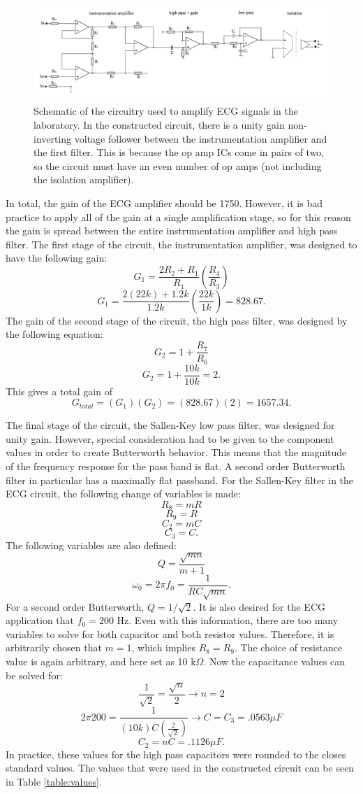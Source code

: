 \documentclass[pdftex,12pt,letterpaper]{article}
\begin{document}
\begin{figure}[H]
\begin{center}
\includegraphics[scale=.35]{ECG_circuit.png}
\caption{Schematic of the circuitry used to amplify ECG signals in the laboratory. In the constructed circuit, there is a unity gain non-inverting voltage follower between the instrumentation amplifier and the first filter. This is because the op amp ICs come in pairs of two, so the circuit must have an even number of op amps (not including the isolation amplifier).}
\label{fig:circuit}
\end{center}
\end{figure}

In total, the gain of the ECG amplifier should be 1750. However, it is bad practice to apply all of the gain at a single amplification stage, so for this reason the gain is spread between the entire instrumentation amplifier and high pass filter. The first stage of the circuit, the instrumentation amplifier, was designed to have the following gain:
$$
G_1 = \frac{2R_2+R_1}{R_1}(\frac{R_4}{R_3})
$$
$$
G_1 = \frac{2(22k)+1.2k}{1.2k}(\frac{22k}{1k}) = 828.67.
$$
The gain of the second stage of the circuit, the high pass filter,  was designed by the following equation:
$$
G_2 = 1 + \frac{R_7}{R_6}
$$
$$
G_2 = 1 + \frac{10k}{10k} = 2.
$$
This gives a total gain of
$$
G_{total} = (G_1)(G_2) = (828.67)(2) = 1657.34.
$$

The final stage of the circuit, the Sallen-Key low pass filter, was designed for unity gain. However, special consideration had to be given to the component values in order to create Butterworth behavior. This means that the magnitude of the frequency response for the pass band is flat. A second order Butterworth filter in particular has a maximally flat passband. For the Sallen-Key filter in the ECG circuit, the following change of variables is made:
$$
R_8 = mR
$$
$$
R_9 = R
$$
$$
C_2 = mC
$$
$$
C_3 = C.
$$
The following variables are also defined:
$$
Q = \frac{\sqrt{mn}}{m+1}
$$
$$
\omega_0 = 2\pi f_0 = \frac{1}{RC\sqrt{mn}}.
$$
For a second order Butterworth, $Q = 1/\sqrt{2}$. It is also desired for the ECG application that $f_0 = 200$ Hz. Even with this information, there are too many variables to solve for both capacitor and both resistor values. Therefore, it is arbitrarily chosen that $m=1$, which implies $R_8 = R_9$. The choice of resistance value is again arbitrary, and here set as 10 k$\Omega$. Now the capacitance values can be solved for:
$$
\frac{1}{\sqrt{2}} = \frac{\sqrt{n}}{2} \rightarrow n = 2
$$
$$
2\pi 200 = \frac{1}{(10k)C(\frac{2}{\sqrt{2}})} \rightarrow C = C_3 = .0563 \mu F
$$
$$
C_2 = nC = .1126 \mu F.
$$
In practice, these values for the high pass capacitors were rounded to the closes standard values. The values that were used in the constructed circuit can be seen in Table \ref{table:values}.
\end{document}
